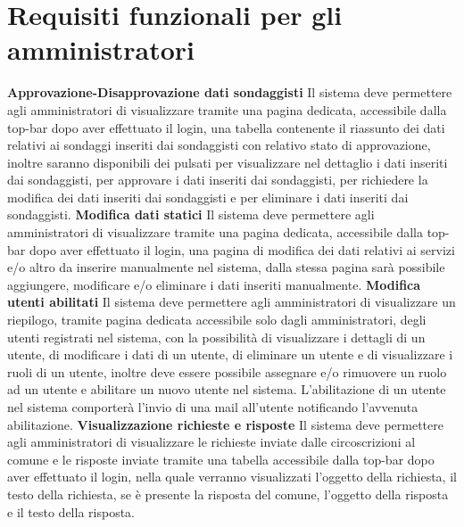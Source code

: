     \section{Requisiti funzionali per gli amministratori}
        \begin{rfList}
            \rfItem \textbf{Approvazione-Disapprovazione dati sondaggisti } Il sistema deve permettere agli amministratori di visualizzare tramite una pagina dedicata, accessibile dalla top-bar dopo aver effettuato il login, una tabella contenente il riassunto dei dati relativi ai sondaggi inseriti dai sondaggisti con relativo stato di approvazione, inoltre saranno disponibili dei pulsati per visualizzare nel dettaglio i dati inseriti dai sondaggisti, per approvare i dati inseriti dai sondaggisti, per richiedere la modifica dei dati inseriti dai sondaggisti e per eliminare i dati inseriti dai sondaggisti.
            \rfItem \textbf{Modifica dati statici} Il sistema deve permettere agli amministratori di visualizzare tramite una pagina dedicata, accessibile dalla top-bar dopo aver effettuato il login, una pagina di modifica dei dati relativi ai servizi e/o altro da inserire manualmente nel sistema, dalla stessa pagina sarà possibile aggiungere, modificare e/o eliminare i dati inseriti manualmente.
            \rfItem \textbf{Modifica utenti abilitati} Il sistema deve permettere agli amministratori di visualizzare un riepilogo, tramite pagina dedicata accessibile solo dagli amministratori, degli utenti registrati nel sistema, con la possibilità di visualizzare i dettagli di un utente, di modificare i dati di un utente, di eliminare un utente e di visualizzare i ruoli di un utente, inoltre deve essere possibile assegnare e/o rimuovere un ruolo ad un utente e abilitare un nuovo utente nel sistema. L'abilitazione di un utente nel sistema comporterà l'invio di una mail all'utente notificando l'avvenuta abilitazione.
            \rfItem \textbf{Visualizzazione richieste e risposte} Il sistema deve permettere agli amministratori di visualizzare le richieste inviate dalle circoscrizioni al comune e le risposte inviate tramite una tabella accessibile dalla top-bar dopo aver effettuato il login, nella quale verranno visualizzati l'oggetto della richiesta, il testo della richiesta, se è presente la risposta del comune, l'oggetto della risposta e il testo della risposta.
        \end{rfList}
